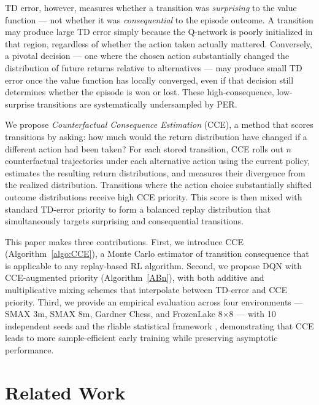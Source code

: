 \documentclass[conference]{IEEEtran}
\begin{document}
TD error, however, measures whether a transition was \emph{surprising} to the value function — not whether it was \emph{consequential} to the episode outcome. A transition may produce large TD error simply because the Q-network is poorly initialized in that region, regardless of whether the action taken actually mattered. Conversely, a pivotal decision — one where the chosen action substantially changed the distribution of future returns relative to alternatives — may produce small TD error once the value function has locally converged, even if that decision still determines whether the episode is won or lost. These high-consequence, low-surprise transitions are systematically undersampled by PER.

We propose \emph{Counterfactual Consequence Estimation} (CCE), a method that scores transitions by asking: how much would the return distribution have changed if a different action had been taken? For each stored transition, CCE rolls out $n$ counterfactual trajectories under each alternative action using the current policy, estimates the resulting return distributions, and measures their divergence from the realized distribution. Transitions where the action choice substantially shifted outcome distributions receive high CCE priority. This score is then mixed with standard TD-error priority to form a balanced replay distribution that simultaneously targets surprising and consequential transitions.

This paper makes three contributions. First, we introduce CCE (Algorithm~\ref{algo:CCE}), a Monte Carlo estimator of transition consequence that is applicable to any replay-based RL algorithm. Second, we propose DQN with CCE-augmented priority (Algorithm~\ref{ABn}), with both additive and multiplicative mixing schemes that interpolate between TD-error and CCE priority. Third, we provide an empirical evaluation across four environments — SMAX 3m, SMAX 8m, Gardner Chess, and FrozenLake 8$\times$8 — with 10 independent seeds and the rliable statistical framework \cite{agarwal2021deep}, demonstrating that CCE leads to more sample-efficient early training while preserving asymptotic performance.

\section{Related Work}
\end{document}
